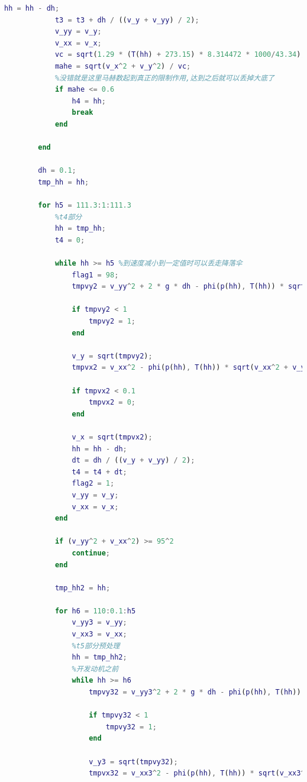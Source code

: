 \documentclass[hyperref,a4paper,UTF8]{ctexart}
\begin{document}
\begin{lstlisting}[language=Matlab]
            hh = hh - dh;
            t3 = t3 + dh / ((v_y + v_yy) / 2);
            v_yy = v_y;
            v_xx = v_x;
            vc = sqrt(1.29 * (T(hh) + 273.15) * 8.314472 * 1000/43.34);
            mahe = sqrt(v_x^2 + v_y^2) / vc;
            %没错就是这里马赫数起到真正的限制作用,达到之后就可以丢掉大底了
            if mahe <= 0.6
                h4 = hh;
                break
            end

        end

        dh = 0.1;
        tmp_hh = hh;

        for h5 = 111.3:1:111.3
            %t4部分
            hh = tmp_hh;
            t4 = 0;

            while hh >= h5 %到速度减小到一定值时可以丢走降落伞
                flag1 = 98;
                tmpvy2 = v_yy^2 + 2 * g * dh - phi(p(hh), T(hh)) * sqrt(v_yy^2 + v_xx^2) * (S_floor + S_para) * dh * v_yy / (m - m_floor);

                if tmpvy2 < 1
                    tmpvy2 = 1;
                end

                v_y = sqrt(tmpvy2);
                tmpvx2 = v_xx^2 - phi(p(hh), T(hh)) * sqrt(v_xx^2 + v_yy^2) * (S_floor + S_para) * dh * v_xx^2 / ((m - m_floor) * v_yy);

                if tmpvx2 < 0.1
                    tmpvx2 = 0;
                end

                v_x = sqrt(tmpvx2);
                hh = hh - dh;
                dt = dh / ((v_y + v_yy) / 2);
                t4 = t4 + dt;
                flag2 = 1;
                v_yy = v_y;
                v_xx = v_x;
            end

            if (v_yy^2 + v_xx^2) >= 95^2
                continue;
            end

            tmp_hh2 = hh;

            for h6 = 110:0.1:h5
                v_yy3 = v_yy;
                v_xx3 = v_xx;
                %t5部分预处理
                hh = tmp_hh2;
                %开发动机之前
                while hh >= h6
                    tmpvy32 = v_yy3^2 + 2 * g * dh - phi(p(hh), T(hh)) * sqrt(v_yy3^2 + v_xx3^2) * (S_floor + S_para) * dh * v_yy3 / (m - m_floor - m_para - m_hide);

                    if tmpvy32 < 1
                        tmpvy32 = 1;
                    end

                    v_y3 = sqrt(tmpvy32);
                    tmpvx32 = v_xx3^2 - phi(p(hh), T(hh)) * sqrt(v_xx3^2 + v_yy3^2) * (S_floor + S_para) * dh * v_xx3^2 / ((m - m_floor - m_para - m_hide) * v_yy3);


\end{lstlisting}
\end{document}

